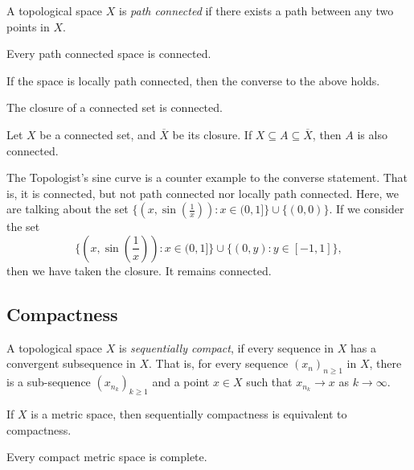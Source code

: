 \begin{df}
A topological space $X$ is \emph{path connected} if there exists a path between any two points in $X$.
\end{df}

\begin{theorem}
Every path connected space is connected. 
\end{theorem}

\begin{remark}
If the space is locally path connected, then the converse to the above holds.
\end{remark}

\begin{proposition}
The closure of a connected set is connected.
\end{proposition}
\begin{corollary}
Let $X$ be a connected set, and $\overline{X}$ be its closure. 
If $X \subseteq A \subseteq \overline{X}$, then $A$ is also connected.
\end{corollary}

\begin{example}
The Topologist's sine curve is a counter example to the converse statement.
That is, it is connected, but not path connected nor locally path connected.
Here, we are talking about the set $\{(x, \sin (\frac{1}{x})) \colon x \in (0,1]\} \cup \{(0,0)\}$.
If we consider the set 
\[
\{(x, \sin (\frac{1}{x})) \colon x \in (0,1]\} \cup \{(0,y) \colon y \in [-1,1]\},
\]
then we have taken the closure. It remains connected.
\end{example}

\subsection{Compactness}

\begin{df}
A topological space $X$ is \emph{sequentially compact}, if every sequence in $X$ has a 
convergent subsequence in $X$. That is, for every sequence $(x_n)_{n \geq 1}$ in $X$, 
there is a sub-sequence $(x_{n_k})_{k \geq 1}$ and a point $x \in X$ such that $x_{n_k} \rightarrow x$ 
as $k \rightarrow \infty$.
\end{df}

\begin{theorem}
If $X$ is a metric space, then sequentially compactness is equivalent to compactness.
\end{theorem}

\begin{corollary}
Every compact metric space is complete.
\end{corollary}